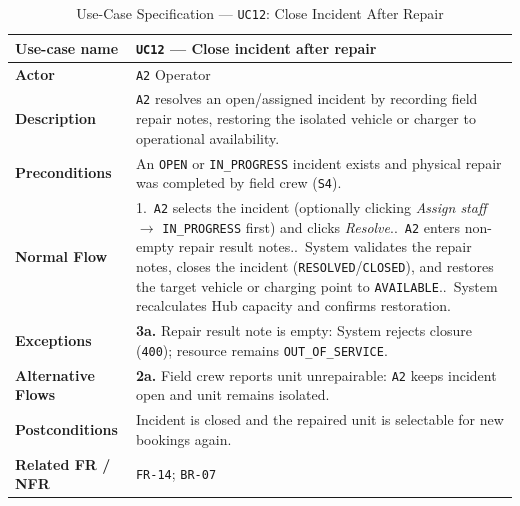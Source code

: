 \begin{table}[H]
  \centering
  \singlespacing\footnotesize
  \caption{Use-Case Specification --- \texttt{UC12}: Close Incident After Repair}
  \label{tab:uc12}
  \renewcommand{\arraystretch}{1.13}
  \begin{tabularx}{\textwidth}{|L{2.9cm}|Y|}
    \hline
    \textbf{Use-case name} & \textbf{\texttt{UC12} --- Close incident after repair} \\
    \hline
    \textbf{Actor} & \texttt{A2} Operator \\
    \hline
    \textbf{Description} & \texttt{A2} resolves an open/assigned incident by recording field repair notes, restoring the isolated vehicle or charger to operational availability. \\
    \hline
    \textbf{Preconditions} & An \texttt{OPEN} or \texttt{IN\_\allowbreak PROGRESS} incident exists and physical repair was completed by field crew (\texttt{S4}). \\
    \hline
    \textbf{Normal Flow} & 1.\ \texttt{A2} selects the incident (optionally clicking \textit{Assign staff} $\rightarrow$ \texttt{IN\_\allowbreak PROGRESS} first) and clicks \textit{Resolve}..\ \texttt{A2} enters non-empty repair result notes..\ System validates the repair notes, closes the incident (\texttt{RESOLVED}/\texttt{CLOSED}), and restores the target vehicle or charging point to \texttt{AVAILABLE}..\ System recalculates Hub capacity and confirms restoration. \\
    \hline
    \textbf{Exceptions} & \textbf{3a.} Repair result note is empty: System rejects closure (\texttt{400}); resource remains \texttt{OUT\_\allowbreak OF\_\allowbreak SERVICE}. \\
    \hline
    \textbf{Alternative Flows} & \textbf{2a.} Field crew reports unit unrepairable: \texttt{A2} keeps incident open and unit remains isolated. \\
    \hline
    \textbf{Postconditions} & Incident is closed and the repaired unit is selectable for new bookings again. \\
    \hline
    \textbf{Related FR / NFR} & \texttt{FR-14}; \texttt{BR-07} \\
    \hline
  \end{tabularx}
\end{table}

